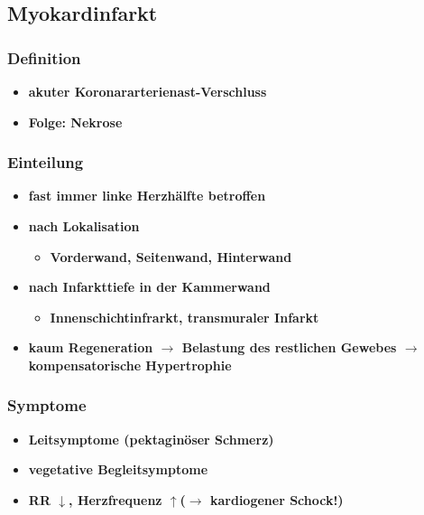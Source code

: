 	\subsection{Myokardinfarkt}
		\subsubsection{Definition}
			\begin{itemize}
				\item \textbf{akuter Koronararterienast-Verschluss}
				\item \textbf{Folge: Nekrose}
			\end{itemize}
		\subsubsection{Einteilung}
			\begin{itemize}
				\item \textbf{fast immer linke Herzhälfte betroffen}
				\item \textbf{nach Lokalisation}
					\begin{itemize}
						\item \textbf{Vorderwand, Seitenwand, Hinterwand}
					\end{itemize}
				\item \textbf{nach Infarkttiefe in der Kammerwand}
					\begin{itemize}
						\item \textbf{Innenschichtinfrarkt, transmuraler Infarkt}
					\end{itemize}
				\item \textbf{kaum Regeneration $\rightarrow$ Belastung des restlichen Gewebes $\rightarrow$ kompensatorische Hypertrophie}
			\end{itemize}
		\subsubsection{Symptome}
			\begin{itemize}
				\item \textbf{Leitsymptome (pektaginöser Schmerz)}
				\item \textbf{vegetative Begleitsymptome}
				\item \textbf{RR $\downarrow$, Herzfrequenz $\uparrow$($\rightarrow$ kardiogener Schock!)}
			\end{itemize}
